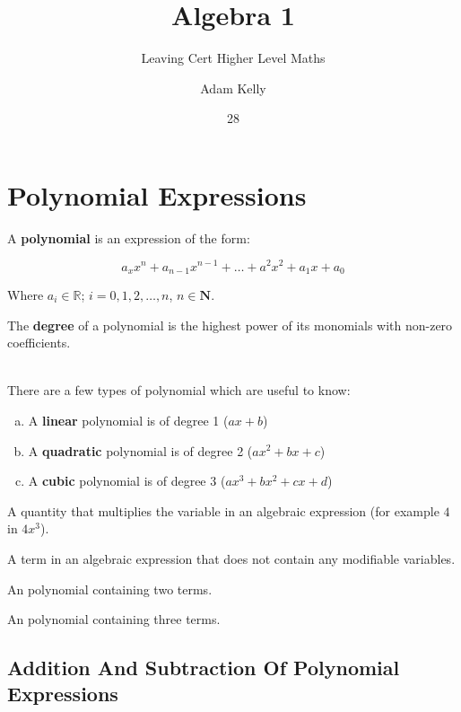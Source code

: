 \documentclass[english,seminar]{lecture}
\title{Algebra 1}
\subtitle{Leaving Cert Higher Level Maths}
\author{Adam Kelly}
\date{28}{08}{2018}
\begin{document}
\section{Polynomial Expressions}


\begin{definition}[Polynomial]
	A \textbf{polynomial} is an expression of the form:

	$$
		a_x x^n + a_{n-1} x^{n - 1} + \dots + a^2 x^2 + a_1 x + a_0
	$$

	Where $a_i \in \mathbb{R}$; $i = 0, 1, 2, \dots, n$, $n \in \mathbf{N}$.
\end{definition}

\begin{definition}[Degree]
	The \textbf{degree} of a polynomial is the highest power of its monomials with non-zero coefficients.
\end{definition}

\\
There are a few types of polynomial which are useful to know:

\begin{enumerate}[a)]
	\item A \textbf{linear} polynomial is of degree 1 ($ax + b$)
	\item A \textbf{quadratic} polynomial is of degree 2 ($ax^2 + bx + c$)
	\item A \textbf{cubic} polynomial is of degree 3 ($ax^3 + bx^2 + cx + d$)
\end{enumerate}

\begin{definition}[Coefficent]
	A quantity that multiplies the variable in an algebraic expression (for example $4$ in $4x^3$).
\end{definition}

\begin{definition}
	A term in an algebraic expression that does not contain any modifiable variables.
\end{definition}

\begin{definition}[Binomial]
	An polynomial containing two terms.
\end{definition}

\begin{definition}[Trinomial]
	An polynomial containing three terms.
\end{definition}

\subsection{Addition And Subtraction Of Polynomial Expressions}
\end{document}
